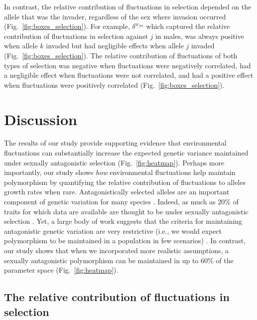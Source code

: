 \documentclass[12pt]{article}
\begin{document}
In contrast, the relative contribution of fluctuations in selection depended on the allele that was the invader, regardless of the sex where invasion occurred (Fig.~\ref{fig:boxes_selection}). For example, $\delta^{w_{jm}}$ which captured the relative contribution of fluctuations in selection against $j$ in males, was always positive when allele $k$ invaded but had negligible effects when allele $j$ invaded (Fig.~\ref{fig:boxes_selection}). The relative contribution of fluctuations of both types of selection was negative when fluctuations were negatively correlated, had a negligible effect when fluctuations were not correlated, and had a positive effect when fluctuations were positively correlated (Fig.~\ref{fig:boxes_selection}).

\section{Discussion}


The results of our study provide supporting evidence that environmental fluctuations can substantially increase the expected genetic variance maintained under sexually antagonistic selection (Fig.~\ref{fig:heatmap}). Perhaps more importantly, our study shows \textit{how} environmental fluctuations help maintain polymorphism by quantifying the relative contribution of fluctuations to alleles growth rates when rare. Antagonistically selected alleles are an important component of genetic variation for many species \citep{foerster2007sexually,van2009intralocus,bonduriansky2009intralocus,innocenti2010sexually}. Indeed, as much as $20\%$ of traits for which data are available are thought to be under sexually antagonistic selection \citep{morrissey2016meta}. Yet, a large body of work suggests that the criteria for maintaining antagonistic genetic variation are very restrictive (i.e., we would expect polymorphism to be maintained in a population in few scenarios) \citep{kidwell1977regions,pamilo1979genic,hedrick1999antagonistic,curtsinger1994antagonistic, patten2010fitness}. In contrast, our study shows that when we incorporated more realistic assumptions, a sexually antagonistic polymorphism can be maintained in up to $60\%$ of the parameter space (Fig.~\ref{fig:heatmap}).

\subsection*{The relative contribution of fluctuations in selection}
\end{document}
